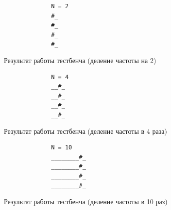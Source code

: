 \documentclass[a4paper]{article}
\begin{document}
  \begin{figure}[H]
    \begin{subfigure}[b]{0.75\textwidth}
      \centering
    \end{subfigure}
    \hfill
    \begin{subfigure}[b]{0.2\textwidth}
      \begin{verbatim}
        N = 2
        #_
        #_
        #_
        #_
      \end{verbatim}
    \end{subfigure}
    \caption{Результат работы тестбенча (деление частоты на 2)}
  \end{figure}

  \begin{figure}[H]
    \begin{subfigure}[b]{0.75\textwidth}
      \centering
    \end{subfigure}
    \hfill
    \begin{subfigure}[b]{0.2\textwidth}
      \begin{verbatim}
        N = 4
        __#_
        __#_
        __#_
        __#_
      \end{verbatim}
    \end{subfigure}
    \caption{Результат работы тестбенча (деление частоты в 4 раза)}
  \end{figure}

  \begin{figure}[H]
    \begin{subfigure}[b]{0.75\textwidth}
      \centering
    \end{subfigure}
    \hfill
    \begin{subfigure}[b]{0.2\textwidth}
      \begin{verbatim}
        N = 10
        ________#_
        ________#_
        ________#_
        ________#_
      \end{verbatim}
    \end{subfigure}
    \caption{Результат работы тестбенча (деление частоты в 10 раз)}
  \end{figure}
\end{document}
